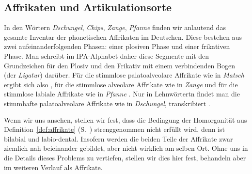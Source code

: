 \subsection{Affrikaten und Artikulationsorte}

\label{sec:affrikatenartikulationsorte}


In den Wörtern \textit{Dschungel}, \textit{Chips}, \textit{Zange}, \textit{Pfanne} finden wir anlautend das gesamte Inventar der phonetischen Affrikaten im Deutschen.
Diese bestehen aus zwei aufeinanderfolgenden Phasen: einer plosiven Phase und einer frikativen Phase.
Man schreibt im IPA-Alphabet daher diese Segmente mit den Grundzeichen für den Plosiv und den Frikativ mit einem verbindenden Bogen (der \textit{Ligatur}) darüber.
Für die stimmlose palatoalveolare Affrikate wie in \textit{Matsch} ergibt sich also \textipa{[\t{tS}]}, für die stimmlose alveolare Affrikate wie in \textit{Zange} \textipa{[\t{ts}]} und für die stimmlose labiale Affrikate wie in \textit{Pfanne} \textipa{[\t{pf}]}.
Nur in Lehnwörtertn findet man die stimmhafte palatoalveolare Affrikate wie in \textit{Dschungel}, transkribiert \textipa{[\t{dZ}]}.

Wenn wir uns \textipa{[\t{pf}]} ansehen, stellen wir fest, dass die Bedingung der Homorganität aus Definition~\ref{def:affrikate} (S.~\pageref{def:affrikate}) strenggenommen nicht erfüllt wird, denn \textipa{[p]} ist bilabial und \textipa{[f]} labio-dental.
Insofern werden die beiden Teile der Affrikate zwar ziemlich nah beieinander gebildet, aber nicht wirklich am selben Ort.
Ohne uns in die Details dieses Problems zu vertiefen, stellen wir dies hier fest, behandeln \textipa{[\t{pf}]} aber im weiteren Verlauf als Affrikate.

